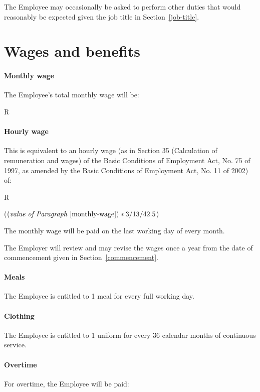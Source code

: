 \documentclass[a4paper,11pt]{article}
\begin{document}
\para The Employee may occasionally be asked to perform other duties that would
reasonably be expected given the job title in Section~\ref{job-title}.

\section{Wages and benefits}
\label{wages}

\paragraph{Monthly wage}\label{monthly-wage} The Employee's total monthly wage
will be:

\begin{center}
  R 
\end{center}

\paragraph{Hourly wage}\label{hourly-wage} This is equivalent to an hourly wage
(as in Section 35 (Calculation of remuneration and wages) of the Basic
Conditions of Employment Act, No. 75 of 1997, as amended by the Basic
Conditions of Employment Act, No. 11 of 2002) of:

\begin{center}
  R 

  (\((\text{\textit{value of Paragraph}~\ref{monthly-wage}}) * 3 / 13 / 42.5 \))
\end{center}

\para\label{monthly-wage-pay-day} The monthly wage will be paid on the last
working day of every month.

\para The Employer will review and may revise the wages once a year from the
date of commencement given in Section~\ref{commencement}.

\paragraph{Meals} The Employee is entitled to 1 meal for every full working
day.

\paragraph{Clothing} The Employee is entitled to 1 uniform for every 36 calendar
months of continuous service.

\paragraph{Overtime}\label{overtime-wage} For overtime, the Employee will be
paid:
\end{document}

